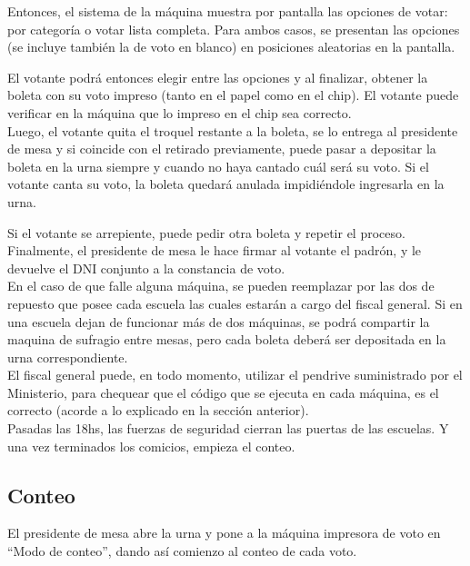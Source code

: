 Entonces, el sistema de la máquina muestra por pantalla las opciones de votar: por categoría o votar lista completa. Para ambos casos, se presentan las opciones (se incluye también la de voto en blanco) en posiciones aleatorias en la pantalla.

El votante podrá entonces elegir entre las opciones y al finalizar, obtener la boleta con su voto impreso (tanto en el papel como en el chip). El votante puede verificar en la máquina que lo impreso en el chip sea correcto.\\

Luego, el votante quita el troquel restante a la boleta, se lo entrega al presidente de mesa y si coincide con el retirado previamente, puede pasar a depositar la boleta en la urna siempre y cuando no haya cantado cuál será su voto. Si el votante canta su voto, la boleta quedará anulada impidiéndole ingresarla en la urna. 

Si el votante se arrepiente, puede pedir otra boleta y repetir el proceso.
Finalmente, el presidente de mesa le hace firmar al votante el padrón, y le devuelve el DNI conjunto a la constancia de voto.\\

En el caso de que falle alguna máquina, se pueden reemplazar por las dos de repuesto que posee cada escuela las cuales estarán a cargo del fiscal general. Si en una escuela dejan de funcionar más de dos máquinas, se podrá compartir la maquina de sufragio entre mesas, pero cada boleta deberá ser depositada en la urna correspondiente.\\

El fiscal general puede, en todo momento, utilizar el pendrive suministrado por el Ministerio, para chequear que el código que se ejecuta en cada máquina, es el correcto (acorde a lo explicado en la secci\'on anterior).\\

Pasadas las 18hs, las fuerzas de seguridad cierran las puertas de las escuelas. Y una vez terminados los comicios, empieza el conteo.\\

\subsection{Conteo}


El presidente de mesa abre la urna y pone a la máquina impresora de voto en “Modo de conteo”, dando así comienzo al conteo de cada voto. \\

